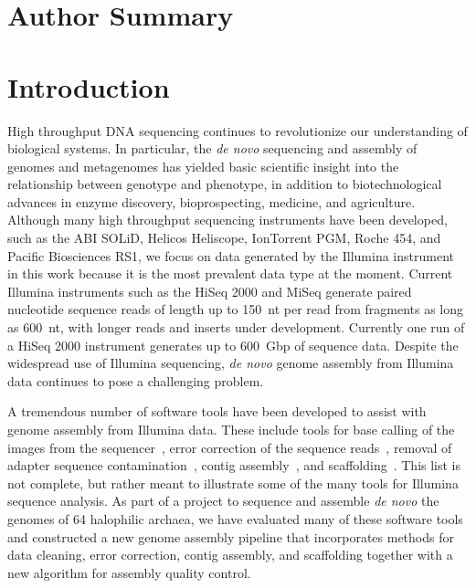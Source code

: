 \documentclass[10pt]{article}
\begin{document}
\section*{Author Summary}

\section*{Introduction}
High throughput DNA sequencing continues to revolutionize our understanding of biological systems. In particular,
the \textit{de novo} sequencing and assembly of genomes and metagenomes has yielded basic scientific insight into 
the relationship between genotype and phenotype,
in addition to biotechnological advances in enzyme discovery, bioprospecting, medicine, and agriculture.  
Although many high throughput sequencing instruments have been developed, such as the ABI SOLiD, Helicos Heliscope, IonTorrent PGM, Roche 454, and 
Pacific Biosciences RS1, we focus on data generated by the Illumina instrument in this work because it is the most prevalent data type at the moment. 
Current Illumina instruments such as the HiSeq 2000 and MiSeq generate paired nucleotide sequence reads of length up to 150~nt per read from fragments  
as long as 600~nt, with longer reads and inserts under development. Currently one run of a HiSeq 2000 instrument generates up to 600~Gbp of sequence data.  Despite the widespread use of Illumina  
sequencing, \emph{de novo} genome assembly from Illumina data continues to pose a challenging problem.

A tremendous number of software tools have been developed to assist with genome assembly from Illumina data.
These include tools for base calling of the images from the sequencer~\cite{BayesCall,Kircher2009},
error correction of the sequence reads~\cite{Kelley2010,Kao2011}, removal of adapter sequence contamination~\cite{Lassmann2009},
contig assembly~\cite{Warren2007,Chaisson2008}, and scaffolding~\cite{Koren2011,Boetzer2011,Dayarian2010}.
This list is not complete, but rather meant to illustrate some of the many tools for Illumina sequence analysis.
As part of a project to sequence and assemble \textit{de novo} the genomes of 64 halophilic archaea, we have
evaluated many of these software tools and constructed a new genome assembly pipeline that incorporates
methods for data cleaning, error correction, contig assembly, and scaffolding together with a new algorithm
for assembly quality control. 
\end{document}
